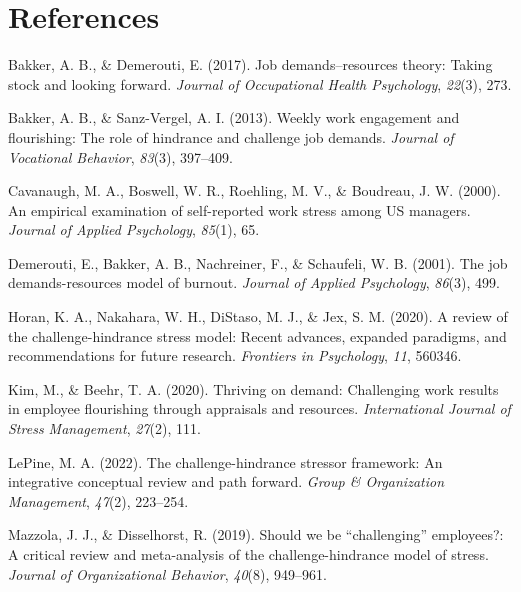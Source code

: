 \documentclass[
  man]{apa6}
\newlength{\cslhangindent}
\newlength{\cslentryspacingunit} %
\newenvironment{CSLReferences}[2] %
 {%
  \setlength{\parindent}{0pt}
  \ifodd #1
  \let\oldpar\par
  \def\par{\hangindent=\cslhangindent\oldpar}
  \fi
  \setlength{\parskip}{#2\cslentryspacingunit}
 }%
 {}
\begin{document}
\hypertarget{references}{%
\section*{References}\label{references}}

\hypertarget{refs}{}
\begin{CSLReferences}{1}{0}
\leavevmode{}%
Bakker, A. B., \& Demerouti, E. (2017). Job demands--resources theory: Taking stock and looking forward. \emph{Journal of Occupational Health Psychology}, \emph{22}(3), 273.

\leavevmode{}%
Bakker, A. B., \& Sanz-Vergel, A. I. (2013). Weekly work engagement and flourishing: The role of hindrance and challenge job demands. \emph{Journal of Vocational Behavior}, \emph{83}(3), 397--409.

\leavevmode{}%
Cavanaugh, M. A., Boswell, W. R., Roehling, M. V., \& Boudreau, J. W. (2000). An empirical examination of self-reported work stress among US managers. \emph{Journal of Applied Psychology}, \emph{85}(1), 65.

\leavevmode{}%
Demerouti, E., Bakker, A. B., Nachreiner, F., \& Schaufeli, W. B. (2001). The job demands-resources model of burnout. \emph{Journal of Applied Psychology}, \emph{86}(3), 499.

\leavevmode{}%
Horan, K. A., Nakahara, W. H., DiStaso, M. J., \& Jex, S. M. (2020). A review of the challenge-hindrance stress model: Recent advances, expanded paradigms, and recommendations for future research. \emph{Frontiers in Psychology}, \emph{11}, 560346.

\leavevmode{}%
Kim, M., \& Beehr, T. A. (2020). Thriving on demand: Challenging work results in employee flourishing through appraisals and resources. \emph{International Journal of Stress Management}, \emph{27}(2), 111.

\leavevmode{}%
LePine, M. A. (2022). The challenge-hindrance stressor framework: An integrative conceptual review and path forward. \emph{Group \& Organization Management}, \emph{47}(2), 223--254.

\leavevmode{}%
Mazzola, J. J., \& Disselhorst, R. (2019). Should we be {``challenging''} employees?: A critical review and meta-analysis of the challenge-hindrance model of stress. \emph{Journal of Organizational Behavior}, \emph{40}(8), 949--961.


\end{CSLReferences}
\end{document}
